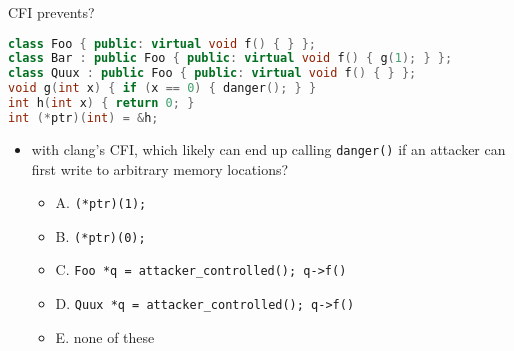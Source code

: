 \begin{frame}[fragile,label=cfiPrevents]{CFI prevents?}
\begin{lstlisting}[language=C++,style=script]
class Foo { public: virtual void f() { } };
class Bar : public Foo { public: virtual void f() { g(1); } };
class Quux : public Foo { public: virtual void f() { } };
void g(int x) { if (x == 0) { danger(); } }
int h(int x) { return 0; }
int (*ptr)(int) = &h;
\end{lstlisting}
\begin{itemize}
\item with clang's CFI, which likely can end up calling \texttt{danger()}
      if an attacker can first write to arbitrary memory locations?
    \begin{itemize}
    \item A. \lstinline|(*ptr)(1);| 
    \item B. \lstinline|(*ptr)(0);| 
    \item C. \lstinline|Foo *q = attacker_controlled(); q->f()| 
    \item D. \lstinline|Quux *q = attacker_controlled(); q->f()| 
    \item E. none of these
    \end{itemize}
\end{itemize}
\end{frame}
